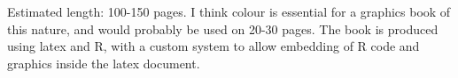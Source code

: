 \documentclass[oneside,letterpaper]{scrartcl}
\begin{document}

Estimated length: 100-150 pages.  I think colour is essential for a graphics book of this nature, and would probably be used on 20-30 pages.  The book is produced using latex and R, with a custom system to allow embedding of R code and graphics inside the latex document.


\end{document}
